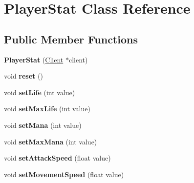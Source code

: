 \hypertarget{class_player_stat}{\section{Player\-Stat Class Reference}
\label{class_player_stat}
}
\subsection*{Public Member Functions}
\begin{DoxyCompactItemize}
\item 
\hypertarget{class_player_stat_aa1a5480e2d1e1f17f68262a4adbaf7fe}{{\bfseries Player\-Stat} (\hyperlink{class_client}{Client} $\ast$client)}\label{class_player_stat_aa1a5480e2d1e1f17f68262a4adbaf7fe}

\item 
\hypertarget{class_player_stat_a8ec17fc597f3dda53f6b629a8305663c}{void {\bfseries reset} ()}\label{class_player_stat_a8ec17fc597f3dda53f6b629a8305663c}

\item 
\hypertarget{class_player_stat_a98cc5b0236fe3549f41fcc6ed39b0249}{void {\bfseries set\-Life} (int value)}\label{class_player_stat_a98cc5b0236fe3549f41fcc6ed39b0249}

\item 
\hypertarget{class_player_stat_a79ad0c86e55166e9769f93f259afde96}{void {\bfseries set\-Max\-Life} (int value)}\label{class_player_stat_a79ad0c86e55166e9769f93f259afde96}

\item 
\hypertarget{class_player_stat_a7abe780bf351ded5093dbff8c4aa965f}{void {\bfseries set\-Mana} (int value)}\label{class_player_stat_a7abe780bf351ded5093dbff8c4aa965f}

\item 
\hypertarget{class_player_stat_a7cb46a0776527d84d0257ad3018a01f9}{void {\bfseries set\-Max\-Mana} (int value)}\label{class_player_stat_a7cb46a0776527d84d0257ad3018a01f9}

\item 
\hypertarget{class_player_stat_a513f0a38e0583b2b94ed69fcaaaaf799}{void {\bfseries set\-Attack\-Speed} (float value)}\label{class_player_stat_a513f0a38e0583b2b94ed69fcaaaaf799}

\item 
\hypertarget{class_player_stat_a717dce0c4ab5cff132cd653e9b6e6f29}{void {\bfseries set\-Movement\-Speed} (float value)}\label{class_player_stat_a717dce0c4ab5cff132cd653e9b6e6f29}


\end{DoxyCompactItemize}
